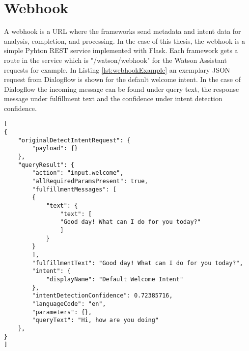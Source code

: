 \section{Webhook} \label{sec:webhook}
A webhook is a URL where the frameworks send metadata and intent data for analysis, completion, and processing.
In the case of this thesis, the webhook is a simple Pyhton REST service implemented with Flask.
Each framework gets a route in the service which is "/watson/webhook" for the Watson Assistant requests for example.
In Listing \ref{lst:webhookExample} an exemplary JSON request from Dialogflow is shown for the default welcome intent.
In the case of Dialogflow the incoming message can be found under query text, the response message under fulfillment text and the confidence under intent detection confidence. 
\begin{lstlisting}[caption={Dialogflow Webhook Request Example}, label={lst:webhookExample},captionpos=b,frame=single,language={[Sharp]C},commentstyle=\color{mygreen},keywordstyle=\color{blue},
morekeywords={}]                
[
{
    "originalDetectIntentRequest": {
        "payload": {}
    },
    "queryResult": {
        "action": "input.welcome",
        "allRequiredParamsPresent": true,
        "fulfillmentMessages": [
        {
            "text": {
                "text": [
                "Good day! What can I do for you today?"
                ]
            }
        }
        ],
        "fulfillmentText": "Good day! What can I do for you today?",
        "intent": {
            "displayName": "Default Welcome Intent"
        },
        "intentDetectionConfidence": 0.72385716,
        "languageCode": "en",
        "parameters": {},
        "queryText": "Hi, how are you doing"
    },
}
]\end{lstlisting}  

